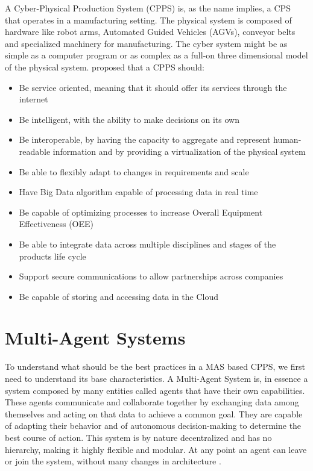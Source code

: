 A Cyber-Physical Production System (CPPS) is, as the name implies, a CPS that operates in a manufacturing setting. The physical system is composed of hardware like robot arms, Automated Guided Vehicles (AGVs), conveyor belts and specialized machinery for manufacturing. The cyber system might be as simple as a computer program or as complex as a full-on three dimensional model of the physical system. \citeauthor{birgit01} \cite{birgit01} proposed that a CPPS should:
\begin{itemize}
	\item Be service oriented, meaning that it should offer its services through the internet
	\item Be intelligent, with the ability to make decisions on its own
	\item Be interoperable, by having the capacity to aggregate and represent human-readable information and by providing a virtualization of the physical system
	\item Be able to flexibly adapt to changes in requirements and scale
	\item Have Big Data algorithm capable of processing data in real time
	\item Be capable of optimizing processes to increase Overall Equipment Effectiveness (OEE)
	\item Be able to integrate data across multiple disciplines and stages of the products life cycle
	\item Support secure communications to allow partnerships across companies
	\item Be capable of storing and accessing data in the Cloud
\end{itemize}

\section{Multi-Agent Systems}
\label{sec:multi-agent_systems}


To understand what should be the best practices in a MAS based CPPS, we first need to understand its base characteristics. A Multi-Agent System is, in essence a system composed by many entities called agents that have their own capabilities. These agents communicate and collaborate together by exchanging data among themselves and acting on that data to achieve a common goal. They are capable of adapting their behavior and of autonomous decision-making to determine the best course of action. This system is by nature decentralized and has no hierarchy, making it highly flexible and modular. At any point an agent can leave or join the system, without many changes in architecture \cite{paulo02}.\\


